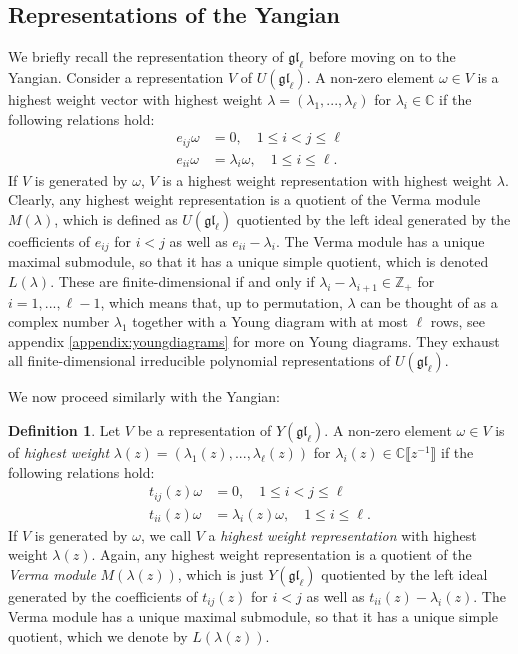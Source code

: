 \documentclass[11pt]{report}
\theoremstyle{definition}
\newtheorem{definition}[theorem]{Definition}
\theoremstyle{remark}
\theoremstyle{remark}
\newcommand{\Z}{\mathbb{Z}}
\newcommand{\C}{\mathbb{C}}
\begin{document}
\subsection{Representations of the Yangian}

We briefly recall the representation theory of $\mathfrak{gl}_\ell$ before moving on to the Yangian. Consider a representation $V$ of $U(\mathfrak{gl}_\ell)$. A non-zero element $\omega \in V$ is a highest weight vector with highest weight $\lambda = (\lambda_1,...,\lambda_\ell)$ for $\lambda_i \in \C$ if the following relations hold:
\begin{align*}
e_{ij} \omega &= 0, \quad 1 \leq i < j \leq \ell \\
e_{ii} \omega &= \lambda_i \omega, \quad 1 \leq i \leq \ell.
\end{align*}
If $V$ is generated by $\omega$, $V$ is a highest weight representation with highest weight $\lambda$. Clearly, any highest weight representation is a quotient of the Verma module $M(\lambda)$, which is defined as $U(\mathfrak{gl}_\ell)$ quotiented by the left ideal generated by the coefficients of $e_{ij}$ for $i<j$ as well as $e_{ii} - \lambda_i$. The Verma module has a unique maximal submodule, so that it has a unique simple quotient, which is denoted $L(\lambda)$. These are finite-dimensional if and only if $\lambda_i - \lambda_{i+1} \in \Z_+$ for $i=1,...,\ell-1$, which means that, up to permutation, $\lambda$ can be thought of as a complex number $\lambda_1$ together with a Young diagram with at most $\ell$ rows, see appendix \ref{appendix:youngdiagrams} for more on Young diagrams. They exhaust all finite-dimensional irreducible polynomial representations of $U(\mathfrak{gl}_\ell)$.

We now proceed similarly with the Yangian:

\begin{definition}
Let $V$ be a representation of $Y(\mathfrak{gl}_\ell)$. A non-zero element $\omega \in V$ is of \emph{highest weight} $\lambda(z) = (\lambda_1(z),...,\lambda_\ell(z))$ for $\lambda_i(z) \in \C\llbracket z^{-1} \rrbracket$ if the following relations hold:
\begin{align*}
t_{ij}(z) \omega &= 0, \quad 1 \leq i < j \leq \ell \\
t_{ii}(z) \omega &= \lambda_i(z) \omega, \quad 1 \leq i \leq \ell.
\end{align*}
If $V$ is generated by $\omega$, we call $V$ a \emph{highest weight representation} with highest weight $\lambda(z)$. Again, any highest weight representation is a quotient of the \emph{Verma module} $M(\lambda(z))$, which is just $Y(\mathfrak{gl}_\ell)$ quotiented by the left ideal generated by the coefficients of $t_{ij}(z)$ for $i<j$ as well as $t_{ii}(z) - \lambda_i(z)$. The Verma module has a unique maximal submodule, so that it has a unique simple quotient, which we denote by $L(\lambda(z))$.
\end{definition}
\end{document}
